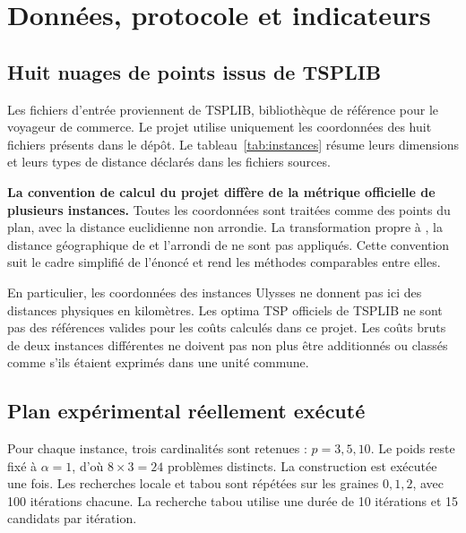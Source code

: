 \chapter{Données, protocole et indicateurs}\label{chap:protocole}
\section{Huit nuages de points issus de TSPLIB}
Les fichiers d'entrée proviennent de TSPLIB, bibliothèque de référence pour
le voyageur de commerce\cite{tsplib}. Le projet utilise uniquement les coordonnées
des huit fichiers présents dans le dépôt. Le tableau~\ref{tab:instances} résume
leurs dimensions et leurs types de distance déclarés dans les fichiers sources.
\begin{table}[htbp]\centering

\caption{Instances de la campagne principale. Le type source est conservé comme métadonnée.}
\label{tab:instances}
\end{table}

\textbf{La convention de calcul du projet diffère de la métrique officielle
de plusieurs instances.} Toutes les coordonnées sont traitées comme des points
du plan, avec la distance euclidienne non arrondie. La transformation propre
à , la distance géographique de  et l'arrondi de
 ne sont pas appliqués. Cette convention suit le cadre simplifié
de l'énoncé et rend les méthodes comparables entre elles.

En particulier, les coordonnées des instances Ulysses ne donnent pas ici des
distances physiques en kilomètres. Les optima TSP officiels de TSPLIB ne sont
pas des références valides pour les coûts calculés dans ce projet. Les coûts
bruts de deux instances différentes ne doivent pas non plus être additionnés
ou classés comme s'ils étaient exprimés dans une unité commune.

\section{Plan expérimental réellement exécuté}
Pour chaque instance, trois cardinalités sont retenues : $p=3,5,10$.
Le poids reste fixé à $\alpha=1$, d'où $8\times3=24$ problèmes distincts.
La construction est exécutée une fois. Les recherches locale et tabou sont
répétées sur les graines $0,1,2$, avec 100 itérations chacune. La recherche
tabou utilise une durée de 10 itérations et 15 candidats par itération.

